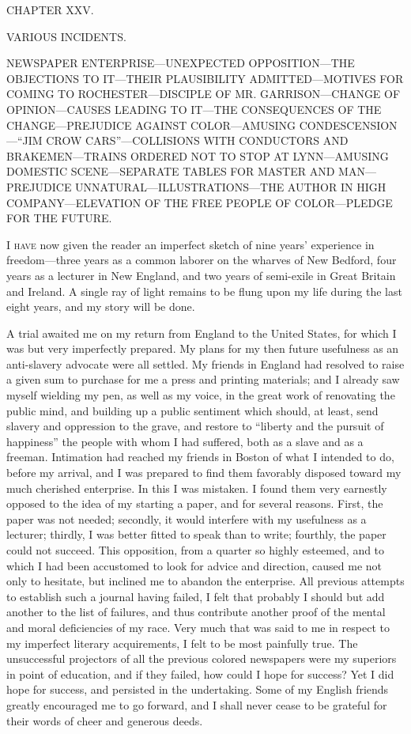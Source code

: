 {\protect\hypertarget{392}{}{}}

{CHAPTER XXV.}

VARIOUS INCIDENTS.

{NEWSPAPER ENTERPRISE---UNEXPECTED OPPOSITION---THE OBJECTIONS TO
IT---THEIR PLAUSIBILITY ADMITTED---MOTIVES FOR COMING TO
ROCHESTER---DISCIPLE OF MR. GARRISON---CHANGE OF OPINION---CAUSES
LEADING TO IT---THE CONSEQUENCES OF THE CHANGE---PREJUDICE AGAINST
COLOR---AMUSING CONDESCENSION---``JIM CROW CARS''---COLLISIONS WITH
CONDUCTORS AND BRAKEMEN---TRAINS ORDERED NOT TO STOP AT LYNN---AMUSING
DOMESTIC SCENE---SEPARATE TABLES FOR MASTER AND MAN---PREJUDICE
UNNATURAL---ILLUSTRATIONS---THE AUTHOR IN HIGH COMPANY---ELEVATION OF
THE FREE PEOPLE OF COLOR---PLEDGE FOR THE FUTURE.}

\textsc{I have} now given the reader an imperfect sketch of nine years'
experience in freedom---three years as a common laborer on the wharves
of New Bedford, four years as a lecturer in New England, and two years
of semi-exile in Great Britain and Ireland. A single ray of light
remains to be flung upon my life during the last eight years, and my
story will be done.

A trial awaited me on my return from England to the United States, for
which I was but very imperfectly prepared. My plans for my then future
usefulness as an anti-slavery advocate were all settled. My friends in
England had resolved to raise a given sum to purchase for me a press and
printing materials; and I already saw myself wielding my pen, as well as
my voice, in the great work of renovating the public mind, and building
up a public sentiment {\protect\hypertarget{393}{}{}}which should, at
least, send slavery and oppression to the grave, and restore to
``liberty and the pursuit of happiness'' the people with whom I had
suffered, both as a slave and as a freeman. Intimation had reached my
friends in Boston of what I intended to do, before my arrival, and I was
prepared to find them favorably disposed toward my much cherished
enterprise. In this I was mistaken. I found them very earnestly opposed
to the idea of my starting a paper, and for several reasons. First, the
paper was not needed; secondly, it would interfere with my usefulness as
a lecturer; thirdly, I was better fitted to speak than to write;
fourthly, the paper could not succeed. This opposition, from a quarter
so highly esteemed, and to which I had been accustomed to look for
advice and direction, caused me not only to hesitate, but inclined me to
abandon the enterprise. All previous attempts to establish such a
journal having failed, I felt that probably I should but add another to
the list of failures, and thus contribute another proof of the mental
and moral deficiencies of my race. Very much that was said to me in
respect to my imperfect literary acquirements, I felt to be most
painfully true. The unsuccessful projectors of all the previous colored
newspapers were my superiors in point of education, and if they failed,
how could I hope for success? Yet I did hope for success, and persisted
in the undertaking. Some of my English friends greatly encouraged me to
go forward, and I shall never cease to be grateful for their words of
cheer and generous deeds.

